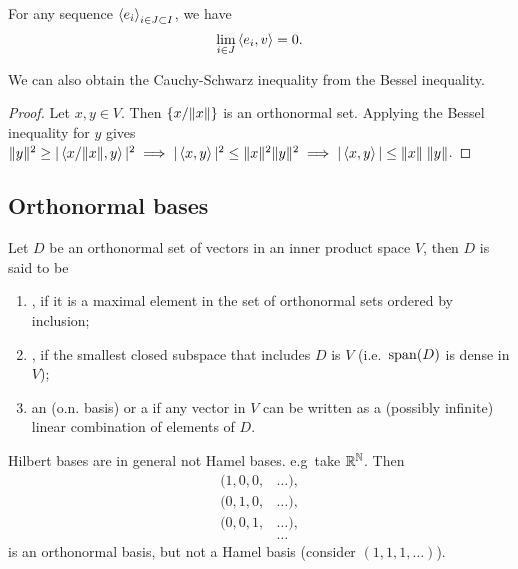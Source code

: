 \begin{corollary}
For any sequence $\left\langle e_i \right\rangle_{i\in J \subset I}$, we have
\[ \lim_{i\in J} \left\langle e_i,v \right\rangle = 0. \]
\end{corollary}

\begin{corollary}
We can also obtain the Cauchy-Schwarz inequality from the Bessel inequality.
\end{corollary}
\begin{proof}
Let $x,y\in V$. Then $\{x/\lVert x\rVert\}$ is an orthonormal set. Applying the Bessel inequality for $y$ gives $\lVert y\rVert^2 \geq |\left\langle x/\lVert x\rVert, y \right\rangle|^2 \implies |\left\langle x,y \right\rangle|^2\leq \lVert x\rVert^2\lVert y\rVert^2 \implies |\left\langle x,y \right\rangle| \leq \lVert x\rVert\;\lVert y\rVert$.
\end{proof}

\subsection{Orthonormal bases}
\begin{definition}
Let $D$ be an orthonormal set of vectors in an inner product space $V$, then $D$ is said to be
\begin{enumerate}
\item {}, if it is a maximal element in the set of orthonormal sets ordered by inclusion;
\item {}, if the smallest closed subspace that includes $D$ is $V$ (i.e.\ $\operatorname{span}(D)$ is dense in $V$);
\item an  (o.n. basis) or a  if any vector in $V$ can be written as a (possibly infinite) linear combination of elements of $D$.
\end{enumerate}
\end{definition}
\begin{note}
Hilbert bases are in general not Hamel bases.  e.g\, take $\mathbb{R}^\mathbb{N}$. Then 
\begin{align*}
(1,0,0,&\ldots), \\
(0,1,0,&\ldots), \\
(0,0,1,&\ldots), \\
&\ldots
\end{align*}
is an orthonormal basis, but not a Hamel basis (consider $(1,1,1,\ldots)$).
\end{note}

